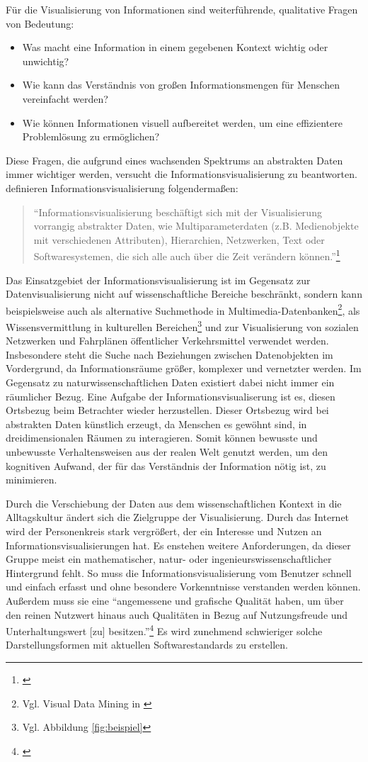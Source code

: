 \documentclass[a4paper, 
               12pt,
               DIV=calc,
               version=first,
               pdftex,
               headsepline,
               footsepline,
               bibtotocnumbered,
               liststotocnumbered]{scrreprt}
\begin{document}
Für die Visualisierung von Informationen sind weiterführende, qualitative Fragen von Bedeutung:
\begin{itemize}
\item Was macht eine Information in einem gegebenen Kontext wichtig oder unwichtig?
\item Wie kann das Verständnis von großen Informationsmengen für Menschen vereinfacht werden?
\item Wie können Informationen visuell aufbereitet werden, um eine effizientere Problemlösung zu ermöglichen?
\end{itemize}
Diese Fragen, die aufgrund eines wachsenden Spektrums an abstrakten Daten immer wichtiger werden,
versucht die Informationsvisualisierung zu beantworten.
\cite{Preim} definieren Informationsvisualisierung folgendermaßen:
\begin{quote}
"`Informationsvisualisierung beschäftigt sich mit der Visualisierung vorrangig abstrakter Daten, wie
Multiparameterdaten (z.B. Medienobjekte mit verschiedenen Attributen), Hierarchien, Netzwerken, Text
oder Softwaresystemen, die sich alle auch über die Zeit verändern können."'\footnote{\citep[S.\,434]{Preim}}
\end{quote}
Das Einsatzgebiet der Informationsvisualisierung ist im Gegensatz zur Datenvisualisierung nicht
auf wissenschaftliche Bereiche beschränkt,
sondern kann beispielsweise auch als alternative Suchmethode in Multimedia-Datenbanken\footnote{Vgl. Visual Data Mining in \citep{Keim}},
als Wissensvermittlung in kulturellen Bereichen\footnote{Vgl. Abbildung \ref{fig:beispiel}} und zur Visualisierung von
sozialen Netzwerken und Fahrplänen öffentlicher Verkehrsmittel verwendet werden.
Insbesondere steht die Suche nach Beziehungen zwischen Datenobjekten im Vordergrund,
da Informationsräume größer, komplexer und vernetzter werden. Im Gegensatz
zu naturwissenschaftlichen Daten existiert dabei nicht immer ein räumlicher Bezug.
Eine Aufgabe der Informationsvisualiserung ist es, diesen Ortsbezug beim Betrachter wieder herzustellen.
Dieser Ortsbezug wird bei abstrakten Daten künstlich erzeugt, da
Menschen es gewöhnt sind, in dreidimensionalen Räumen zu interagieren.
Somit können bewusste und unbewusste Verhaltensweisen aus der realen Welt genutzt werden, um den
kognitiven Aufwand, der für das Verständnis der Information nötig ist, zu minimieren.

Durch die Verschiebung der Daten aus dem wissenschaftlichen Kontext
in die Alltagskultur ändert sich die Zielgruppe der Visualisierung. Durch das Internet
wird der Personenkreis stark vergrößert, der ein Interesse und Nutzen an Informationsvisualisierungen
hat. Es enstehen weitere Anforderungen, da dieser Gruppe meist ein mathematischer, natur- oder ingenieurswissenschaftlicher Hintergrund
fehlt. So muss die Informationsvisualisierung vom Benutzer
schnell und einfach erfasst und ohne besondere Vorkenntnisse verstanden werden können.
Außerdem muss sie eine "`angemessene und grafische Qualität haben, um über den
reinen Nutzwert hinaus auch Qualitäten in Bezug auf Nutzungsfreude und Unterhaltungswert [zu] besitzen."'\footnote{\citep[S.\,438]{Preim}}
Es wird zunehmend schwieriger solche Darstellungsformen mit aktuellen Softwarestandards zu erstellen.
\end{document}
